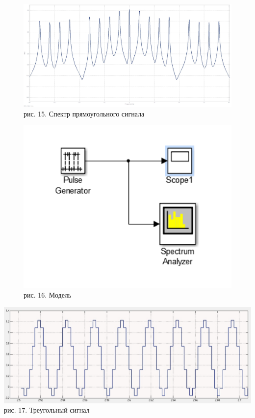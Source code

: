 \documentclass[10pt,a4paper]{report}
\begin{document}
\begin{figure}
\begin{center}
\includegraphics[width=150mm, scale = 0.9]{5_11.jpg}\newline
рис. 15. Спектр прямоугольного сигнала\newline
\end{center}
\end{figure}
\begin{figure}
\begin{center}
\includegraphics[width=150mm, scale = 0.9]{5_12.jpg}\newline
рис. 16. Модель\newline
\end{center}
\end{figure}
\begin{center}
\includegraphics[width=150mm, scale = 0.9]{5_13.jpg}\newline
рис. 17. Треугольный сигнал\newline
\end{center}
\end{document}

